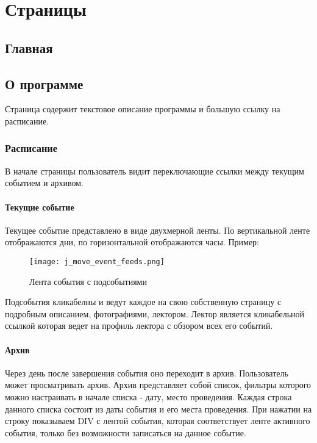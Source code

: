 \documentclass[DIV=calc, paper=a4, fontsize=11pt]{scrartcl} %
\begin{document}
\section{Страницы}

\subsection{Главная}

\subsection{О программе}
Страница содержит текстовое описание программы и большую ссылку на расписание.
\subsubsection{Расписание}
В начале страницы пользователь видит переключающие ссылки между текущим событием и архивом.

\paragraph{Текущие событие}
Текущее событие представлено в виде двухмерной ленты. По вертикальной ленте отображаются дни, по горизонтальной отображаются часы. Пример:
        \begin{figure}[H]
        \centering
        \texttt{[image: j\_move\_event\_feeds.png]}
        \caption{Лента события с подсобытиями\label{fig:j_move_event_feeds.png}}
        \end{figure}

Подсобытия кликабелны и ведут каждое на свою собственную страницу с подробным описанием, фотографиями, лектором. Лектор является кликабельной ссылкой которая ведет на профиль лектора с обзором всех его событий.
        
\paragraph{Архив} 
Через день после завершения события оно переходит в архив. Пользователь может просматривать архив. Архив представляет собой список, фильтры которого можно настраивать в начале списка - дату, место проведения. Каждая строка данного списка состоит из даты события и его места проведения. При нажатии на строку показываем DIV с лентой события, которая соответствует ленте активного события, только без возможности записаться на данное событие.
\end{document}
